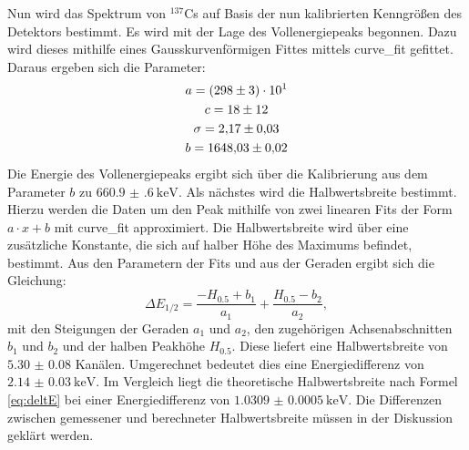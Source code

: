 Nun wird das Spektrum von $^{137}$Cs auf Basis der nun kalibrierten Kenngrößen des Detektors bestimmt. Es wird mit der Lage des Vollenergiepeaks begonnen. Dazu wird dieses mithilfe eines Gausskurvenförmigen Fittes mittels curve\_fit \cite{scipy} gefittet. Daraus ergeben sich die Parameter:
\begin{gather*}
a = \num{298(3)e1}\\
c = \num{18 \pm 12}\\
\sigma = \num{2.17(3)}\\
b = \num{1648.03(2)}
\end{gather*}
 Die Energie des Vollenergiepeaks ergibt sich über die Kalibrierung aus dem Parameter $b$ zu $\SI{660.9(6)}{\kilo\electronvolt}$.
 Als nächstes wird die Halbwertsbreite bestimmt. Hierzu werden die Daten um den Peak mithilfe von zwei linearen Fits der Form $ a \cdot x + b$ mit curve\_fit \cite{scipy} approximiert. Die Halbwertsbreite wird über eine zusätzliche Konstante, die sich auf halber Höhe des Maximums befindet, bestimmt. Aus den Parametern der Fits und aus der Geraden ergibt sich die Gleichung:
\begin{equation}
    \Delta E_\text{1/2} = \frac{-H_{0.5}+b_1}{a_1} + \frac{H_{0.5}-b_2}{a_2}, \label{eq:Z}
\end{equation}
mit den Steigungen der Geraden $a_1$ und $a_2$, den zugehörigen Achsenabschnitten $b_1$ und $b_2$ und der halben Peakhöhe $H_{0.5}$. Diese liefert eine Halbwertsbreite von $\num{5.30(8)}$ Kanälen. Umgerechnet bedeutet dies eine Energiedifferenz von $\SI{2.14(3)}{\kilo\electronvolt}$.
Im Vergleich liegt die theoretische Halbwertsbreite nach Formel \eqref{eq:deltE} bei einer Energiedifferenz von $\SI{1.0309(5)}{\kilo\electronvolt}$. Die Differenzen zwischen gemessener und berechneter Halbwertsbreite müssen in der Diskussion geklärt werden. 
